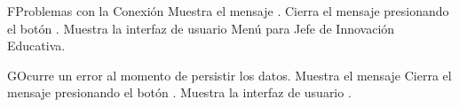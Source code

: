 \begin{UCtrayectoriaA}{F}{Problemas con la Conexión}
    \UCpaso Muestra el mensaje .
    \UCpaso[\UCactor] Cierra el mensaje presionando el botón .
\UCpaso Muestra la interfaz de usuario Menú para Jefe de Innovación Educativa.
\end{UCtrayectoriaA}

\begin{UCtrayectoriaA}{G}{Ocurre un error al momento de persistir los datos.}
    \UCpaso Muestra el mensaje 
    \UCpaso[\UCactor] Cierra el mensaje presionando el botón .
    \UCpaso Muestra la interfaz de usuario .
\end{UCtrayectoriaA}